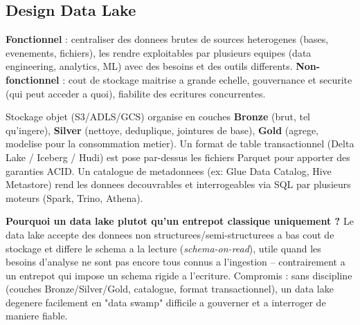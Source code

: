 \documentclass[11pt,a4paper]{article}
\newenvironment{sujet}[1]{%
  \subsection{#1}
}{%
  \bigskip
}
\begin{document}
\begin{sujet}{Design Data Lake}

\begin{req}
\textbf{Fonctionnel} : centraliser des donnees brutes de sources heterogenes (bases, evenements, fichiers), les rendre exploitables par plusieurs equipes (data engineering, analytics, ML) avec des besoins et des outils differents. \textbf{Non-fonctionnel} : cout de stockage maitrise a grande echelle, gouvernance et securite (qui peut acceder a quoi), fiabilite des ecritures concurrentes.
\end{req}

\begin{archbox}
Stockage objet (S3/ADLS/GCS) organise en couches \textbf{Bronze} (brut, tel qu'ingere), \textbf{Silver} (nettoye, deduplique, jointures de base), \textbf{Gold} (agrege, modelise pour la consommation metier). Un format de table transactionnel (Delta Lake / Iceberg / Hudi) est pose par-dessus les fichiers Parquet pour apporter des garanties ACID. Un catalogue de metadonnees (ex: Glue Data Catalog, Hive Metastore) rend les donnees decouvrables et interrogeables via SQL par plusieurs moteurs (Spark, Trino, Athena).
\end{archbox}

\begin{tradeoff}
\textbf{Pourquoi un data lake plutot qu'un entrepot classique uniquement ?} Le data lake accepte des donnees non structurees/semi-structurees a bas cout de stockage et differe le schema a la lecture (\emph{schema-on-read}), utile quand les besoins d'analyse ne sont pas encore tous connus a l'ingestion -- contrairement a un entrepot qui impose un schema rigide a l'ecriture. Compromis : sans discipline (couches Bronze/Silver/Gold, catalogue, format transactionnel), un data lake degenere facilement en "data swamp" difficile a gouverner et a interroger de maniere fiable.
\end{tradeoff}

\end{sujet}
\end{document}
